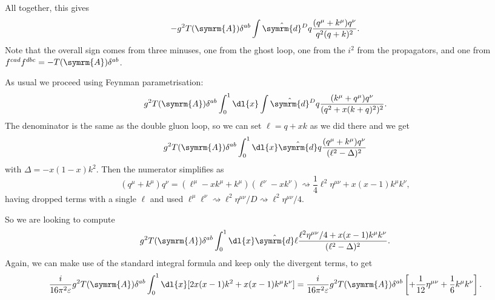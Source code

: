 \documentclass[fleqn]{NotesClass}
\newcommand{\dhat}[1]{\hat{\symrm{d}}{#1}}
\newcommand{\minkowskiMetric}{\eta}
\newcommand{\adjointRep}{\symrm{A}}
\begin{document}
    All together, this gives
    \begin{equation}
        -g^2 T(\adjointRep)\delta^{ab} \int \dhat{^Dq} \frac{(q^\mu + k^\mu) q^\nu}{q^2 (q + k)^2}.
    \end{equation}
    Note that the overall sign comes from three minuses, one from the ghost loop, one from the \(i^2\) from the propagators, and one from \(f^{cad}f^{dbc} = -T(\adjointRep)\delta^{ab}\).
    
    As usual we proceed using Feynman parametrisation:
    \begin{equation}
        g^2T(\adjointRep)\delta^{ab} \int_0^1 \dl{x} \int \dhat{^Dq} \frac{(k^\mu + q^\mu)q^\nu}{(q^2 + x(k + q)^2)^2}.
    \end{equation}
    The denominator is the same as the double gluon loop, so we can set \(\ell = q + xk\) as we did there and we get
    \begin{equation}
        g^2T(\adjointRep) \delta^{ab} \int_0^1 \dl{x} \dhat{q} \frac{(q^\mu + k^\mu)q^\nu}{(\ell^2 - \Delta)^2}
    \end{equation}
    with \(\Delta = -x(1 - x)k^2\).
    Then the numerator simplifies as
    \begin{equation}
        (q^\mu + k^\mu) q^\nu = (\ell^\mu - xk^\mu + k^\mu)(\ell^\nu - xk^\nu) \rightsquigarrow \frac{1}{4}\ell^2\minkowskiMetric^{\mu\nu} + x(x - 1)k^\mu k^\nu,
    \end{equation}
    having dropped terms with a single \(\ell\) and used \(\ell^\mu \ell^\nu \rightsquigarrow \ell^2\minkowskiMetric^{\mu\nu}/D \rightsquigarrow \ell^2\minkowskiMetric^{\mu\nu}/4\).
    
    So we are looking to compute
    \begin{equation}
        g^2T(\adjointRep)\delta^{ab} \int_0^1 \dl{x} \dhat{\ell} \frac{\ell^2\minkowskiMetric^{\mu\nu}/4 + x(x - 1)k^\mu k^\nu}{(\ell^2 - \Delta)^2}.
    \end{equation}
    Again, we can make use of the standard integral formula and keep only the divergent terms, to get
    \begin{equation}
        \frac{i}{16\pi^2\varepsilon} g^2T(\adjointRep) \delta^{ab} \int_0^1 \dl{x} [2x(x - 1)k^2 + x(x - 1)k^\mu k^\nu] = \frac{i}{16\pi^2\varepsilon} g^2T(\adjointRep) \delta^{ab} \left[ +\frac{1}{12}\minkowskiMetric^{\mu\nu} + \frac{1}{6}k^\mu k^\nu \right].
    \end{equation}
    
\end{document}
